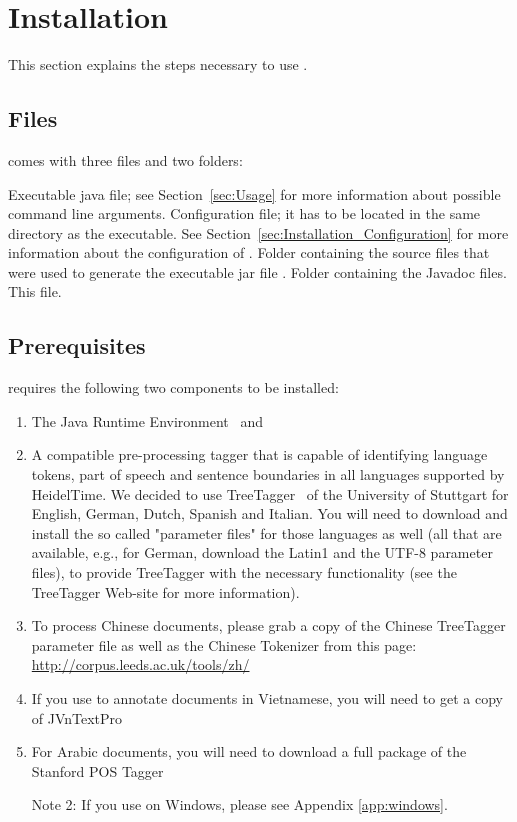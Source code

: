 \section{Installation}\label{sec:Installation}
This section explains the steps necessary to use \product{}.

\subsection{Files}\label{sec:Files}
\product{} comes with three files and two folders:
\begin{itemize}
\itemWithHead{\textnormal{\executableFile}}
Executable java file; see Section~\ref{sec:Usage} for more information about possible command line arguments.
\itemWithHead{\textnormal{\configFile}}
Configuration file; it has to be located in the same directory as the executable. See Section~\ref{sec:Installation_Configuration} for more information about the configuration of \product{}.
Folder containing the source files that were used to generate the executable jar file \executableFile.
Folder containing the Javadoc files.
\itemWithHead{\textnormal{\manualFile}}
This file.

\end{itemize}

\subsection{Prerequisites}\label{sec:Installation_Prerequisites}
\product{} requires the following two components to be installed:
\begin{enumerate}
\item The Java Runtime Environment~\cite{Java} and
\item A compatible pre-processing tagger that is capable of identifying language tokens, part of speech and sentence boundaries in all languages supported by HeidelTime. We decided to use TreeTagger~\cite{TreeTagger} of the University of Stuttgart for English, German, Dutch, Spanish and Italian. You will need to download and install the so called "parameter files" for those languages as well (all that are available, e.g., for German, download the Latin1 and the UTF-8 parameter files), to provide TreeTagger with the necessary functionality (see the TreeTagger Web-site for more information).
\item To process Chinese documents, please grab a copy of the Chinese TreeTagger parameter file as well as the Chinese Tokenizer from this page: \url{http://corpus.leeds.ac.uk/tools/zh/}
\item If you use \product{} to annotate documents in Vietnamese, you will need to get a copy of JVnTextPro~\cite{JVnTextPro}
\item For Arabic documents, you will need to download a full package of the Stanford POS Tagger~\cite{StanfordPOSTagger}

Note 2: If you use \product{} on Windows, please see Appendix \ref{app:windows}.
\end{enumerate}

